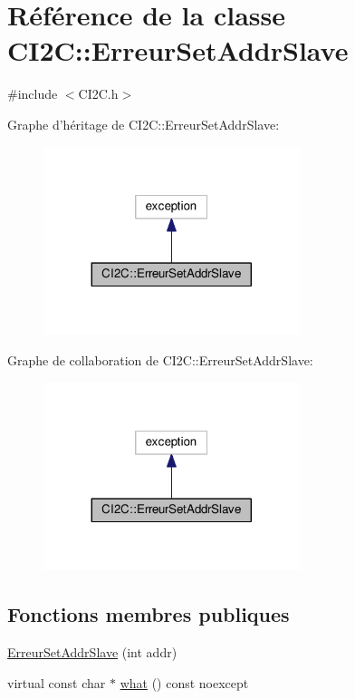 \hypertarget{class_c_i2_c_1_1_erreur_set_addr_slave}{\section{Référence de la classe C\+I2\+C\+:\+:Erreur\+Set\+Addr\+Slave}
\label{class_c_i2_c_1_1_erreur_set_addr_slave}
}


{\ttfamily \#include $<$C\+I2\+C.\+h$>$}



Graphe d'héritage de C\+I2\+C\+:\+:Erreur\+Set\+Addr\+Slave\+:
\nopagebreak
\begin{figure}[H]
\begin{center}
\leavevmode
\includegraphics[width=212pt]{class_c_i2_c_1_1_erreur_set_addr_slave__inherit__graph}
\end{center}
\end{figure}


Graphe de collaboration de C\+I2\+C\+:\+:Erreur\+Set\+Addr\+Slave\+:
\nopagebreak
\begin{figure}[H]
\begin{center}
\leavevmode
\includegraphics[width=212pt]{class_c_i2_c_1_1_erreur_set_addr_slave__coll__graph}
\end{center}
\end{figure}
\subsection*{Fonctions membres publiques}
\begin{DoxyCompactItemize}
\item 
\hyperlink{class_c_i2_c_1_1_erreur_set_addr_slave_ac92f34eb7c68e1b29ae55e0b147bdc02}{Erreur\+Set\+Addr\+Slave} (int addr)
\item 
virtual const char $\ast$ \hyperlink{class_c_i2_c_1_1_erreur_set_addr_slave_a6f82e7fa42f2ea5bb39d9c06517c5b09}{what} () const noexcept
\end{DoxyCompactItemize}
